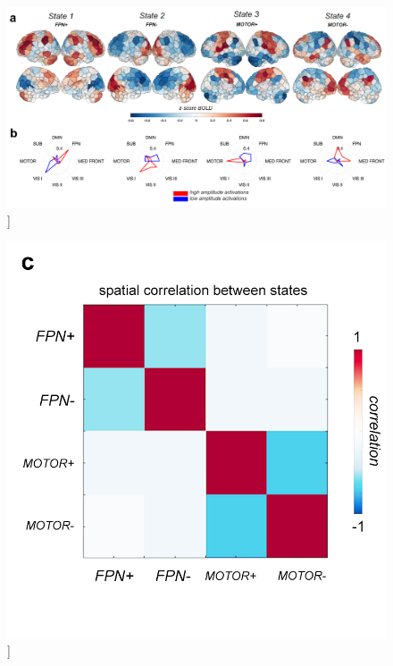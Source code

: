 \documentclass[phd,tocprelim]{cornell}
\renewcommand{\caption}[1]{\singlespacing\hangcaption{#1}\normalspacing}
\begin{document}
\null
\vfill
\clearpage
\null
\vfill
\begin{figure}[h!]
		\ContinuedFloat
		\captionsetup{labelformat=adja-page}
    \centering
    \includegraphics[width=1\textwidth]{chapter2/Figure2ab.png}
    \caption[]{}
\end{figure}
\null
\vfill
\clearpage    
    \null
\vfill
\begin{figure}[h!]
		\ContinuedFloat
		\captionsetup{labelformat=adja-page}
    \centering
    \includegraphics[width=1\textwidth]{chapter2/Figure2c.png}
    \caption[]{}
\end{figure}
\null
\vfill
\end{document}
